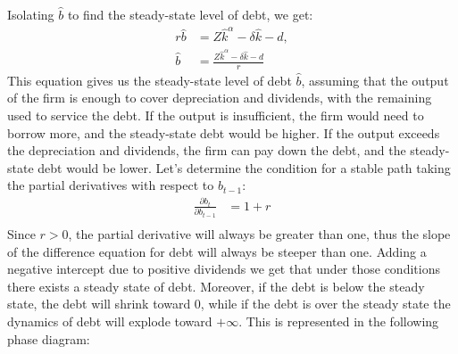 \documentclass[12pt]{report}
\begin{document}
Isolating \( \widehat{b} \) to find the steady-state level of debt, we get:
\begin{align}
    r \widehat{b} &= Z \widehat{k}^\alpha - \delta \widehat{k} - d, \nonumber\\
    \widehat{b} &= \frac{Z \widehat{k}^\alpha - \delta \widehat{k} - d}{r}
\end{align}
This equation gives us the steady-state level of debt \( \widehat{b} \), assuming that the output of the firm is enough
to cover depreciation and dividends, with the remaining used to service the debt. If the output is insufficient, the
firm would need to borrow more, and the steady-state debt would be higher. If the output exceeds the depreciation and
dividends, the firm can pay down the debt, and the steady-state debt would be lower. 
Let's determine the condition for a stable path taking the partial derivatives with respect to \(b_{t-1}\):
\begin{align}
    \frac{\partial{b_t}}{\partial b_{t-1}} &= 1+r  \label{eq11} \\
\end{align}
Since \(r >0\), the partial derivative will always be greater than one, thus the slope of the
difference equation for debt will always be steeper than one. Adding a negative intercept due to positive dividends we
get that under those conditions there exists a steady state of debt. Moreover, if the debt is below the steady state, the
debt will shrink toward 0, while if the debt is over the steady state the dynamics of debt will explode toward
\(+\infty\). This is represented in the following phase diagram:
\end{document}
